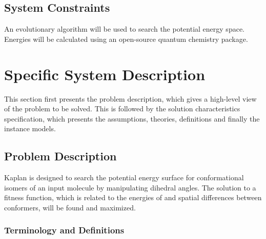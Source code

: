 \documentclass[12pt]{article}
\newcommand{\progname}{Kaplan} %
\begin{document}

\subsection{System Constraints}

An evolutionary algorithm will be used to search the potential energy space. 
Energies will be calculated using an open-source quantum chemistry package.

\section{Specific System Description}

This section first presents the problem description, which gives a high-level
view of the problem to be solved.  This is followed by the solution 
characteristics
specification, which presents the assumptions, theories, definitions and finally
the instance models.  

\subsection{Problem Description} \label{Sec_pd}


\progname{} is designed to search the potential energy surface for 
conformational isomers of an input molecule by manipulating dihedral angles. 
The solution to a fitness function, which is related to the energies of and 
spatial differences between conformers, will be found and maximized.

\subsubsection{Terminology and Definitions}

  
\end{document}
